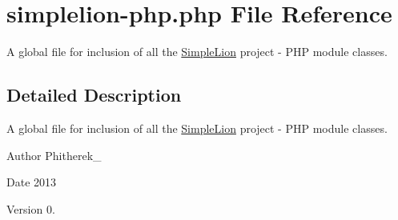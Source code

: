 \hypertarget{simplelion-php_8php}{\section{simplelion-\/php.php File Reference}
\label{simplelion-php_8php}
}


A global file for inclusion of all the \hyperlink{namespace_simple_lion}{Simple\-Lion} project -\/ P\-H\-P module classes.  




\subsection{Detailed Description}
A global file for inclusion of all the \hyperlink{namespace_simple_lion}{Simple\-Lion} project -\/ P\-H\-P module classes. \begin{DoxyAuthor}{Author}
Phitherek\-\_\- 
\end{DoxyAuthor}
\begin{DoxyDate}{Date}
2013 
\end{DoxyDate}
\begin{DoxyVersion}{Version}
0. 
\end{DoxyVersion}
